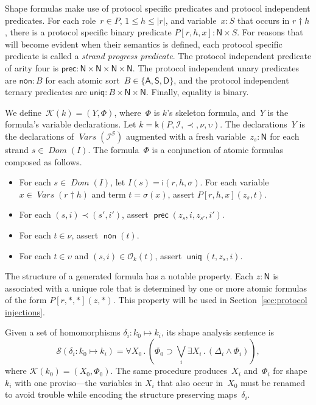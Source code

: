 \documentclass[12pt]{article}
\newcommand{\cn}[1]{\ensuremath{\operatorname{\mathsf{#1}}}}
\newcommand{\fn}[1]{\ensuremath{\operatorname{\mathit{#1}}}}
\newcommand{\srt}[1]{\ensuremath{\mathsf{#1}}}
\newcommand{\typ}{\mathbin:}
\newcommand{\sdom}{\fn{Dom}}
\newcommand{\vars}{\fn{Vars}}
\newcommand{\prefix}[2]{#1\dagger#2}
\newcommand{\all}[1]{\forall#1\mathpunct.}
\newcommand{\some}[1]{\exists#1\mathpunct.}
\newcommand{\ssp}{\ensuremath{\mathcal{S}}}
\newcommand{\form}{\mathcal{K}}
\newcommand{\sent}{\mathcal{S}}
\newcommand{\skel}{\mathsf{k}}
\newcommand{\insta}{\mathsf{i}}
\newcommand{\insts}{\mathcal{I}}
\newcommand{\orig}{\mathcal{O}}
\begin{document}
Shape formulas make use of protocol specific predicates and protocol
independent predicates.  For each role~$r\in P$, $1\leq h\leq|r|$, and
variable~$x\typ S$ that occurs in $\prefix{r}{h}$, there is a protocol
specific binary predicate $P[r,h,x]\typ\srt{N}\times S$.  For reasons
that will become evident when their semantics is defined, each
protocol specific predicate is called a \emph{strand progress
  predicate}. The protocol independent predicate of arity four is
$\mathsf{prec}\typ\srt{N}\times\srt{N}\times\srt{N}\times\srt{N}$.
The protocol independent unary predicates are $\mathsf{non}\typ B$ for
each atomic sort~$B\in\{\srt{A}, \srt{S},\srt{D}\}$, and the protocol
independent ternary predicates are $\mathsf{uniq}\typ
B\times\srt{N}\times\srt{N}$.
Finally, equality is binary.

We define~$\form(k)=(Y,\Phi)$, where~$\Phi$ is $k$'s skeleton formula,
and~$Y$ is the formula's variable declarations.  Let
$k=\skel(P,\insts,\prec,\nu,\upsilon)$.  The declarations~$Y$ is the
declarations of $\vars(\insts^\ssp)$ augmented with a fresh
variable~$z_s\typ\srt{N}$ for each strand $s\in\sdom(I)$.  The
formula~$\Phi$ is a conjunction of atomic formulas composed as
follows.

\begin{itemize}
\item For each $s\in\sdom(I)$, let $I(s)=\insta(r,h,\sigma)$.  For
  each variable $x\in\vars(\prefix{r}{h})$ and term $t=\sigma(x)$, assert
  $P[r,h,x](z_s,t)$.
\item For each $(s,i)\prec(s',i')$, assert
  $\cn{prec}(z_s,i,z_{s'},i')$.
\item For each $t\in\nu$, assert $\cn{non}(t)$.
\item For each $t\in\upsilon$ and $(s,i)\in\orig_k(t)$, assert
  $\cn{uniq}(t,z_s, i)$.
\end{itemize}

The structure of a generated formula has a notable property.  Each
$z\typ\srt{N}$ is associated with a unique role that is determined by
one or more atomic formulas of the form $P[r,\ast,\ast](z,\ast)$.
This property will be used in Section~\ref{sec:protocol injections}.

Given a set of homomorphisms $\delta_i\typ k_0\mapsto k_i$, its shape
analysis sentence is
\begin{equation}\label{eqn:shape sentence}
\sent(\delta_i\typ k_0\mapsto k_i)=\all{X_0}(\Phi_0\supset
\bigvee_i\some{X_i}(\Delta_i\wedge\Phi_i)),
\end{equation}
where $\form(k_0)=(X_0,\Phi_0)$.  The same procedure produces~$X_i$
and~$\Phi_i$ for shape~$k_i$ with one proviso---the variables in
$X_i$ that also occur in~$X_0$ must be renamed to avoid trouble while
encoding the structure preserving maps~$\delta_i$.
\end{document}
